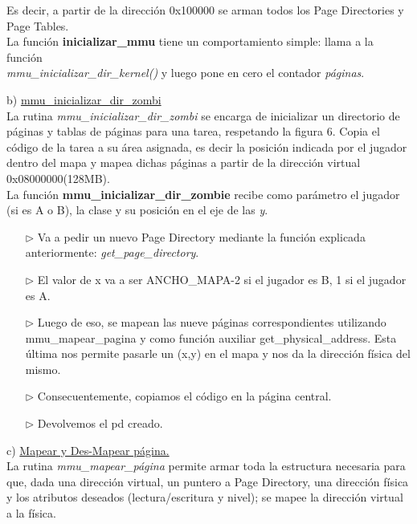 \documentclass[a4paper]{article}
\begin{document}
Es decir, a partir de la direcci\'on 0x100000 se arman todos los Page Directories y Page Tables.\\



La funci\'on \textbf{inicializar_mmu} tiene un comportamiento simple: llama a la funci\'on \\ \textit{mmu_inicializar_dir_kernel()} y luego pone en cero el contador\textit{ p\'aginas}.\\

\bigskip

{\large b)} \underline{mmu_inicializar_dir_zombi}\\

La rutina \textit{mmu_inicializar_dir_zombi} se encarga de inicializar un directorio
de p\'aginas y tablas de p\'aginas para una tarea, respetando la figura 6. Copia
el c\'odigo de la tarea a su \'area asignada, es decir la posici\'on indicada por el jugador dentro
del mapa y mapea dichas p\'aginas a partir de la direcci\'on virtual 0x08000000(128MB).\\

La funci\'on \textbf{mmu_inicializar_dir_zombie} recibe como par\'ametro el jugador (si es A o B), la clase y su posici\'on en el eje de las \emph{y}. 

\begin{itemize}
\item[$\triangleright$] Va a pedir un nuevo Page Directory mediante la funci\'on explicada anteriormente: \textit{get_page_directory}.
\item[$\triangleright$] El valor de x va a ser ANCHO_MAPA-2 si el jugador es B, 1 si el jugador es A.
\item[$\triangleright$] Luego de eso, se mapean las nueve p\'aginas correspondientes utilizando mmu_mapear_pagina y como funci\'on auxiliar get_physical_address. Esta \'ultima nos permite pasarle un (x,y) en el mapa y nos da la direcci\'on f\'isica del mismo.
\item[$\triangleright$] Consecuentemente, copiamos el c\'odigo en la p\'agina central.
\item[$\triangleright$] Devolvemos el pd creado.
\end{itemize}



\newpage

{\large c)} \underline{Mapear y Des-Mapear p\'agina.}\\

 La rutina \textit{mmu_mapear_p\'agina} permite armar toda la estructura necesaria para que, dada una direcci\'on virtual, un puntero a Page Directory, una direcci\'on f\'isica y los atributos deseados (lectura/escritura y nivel); se mapee la direcci\'on virtual a la f\'isica.\\
 
\end{document}
